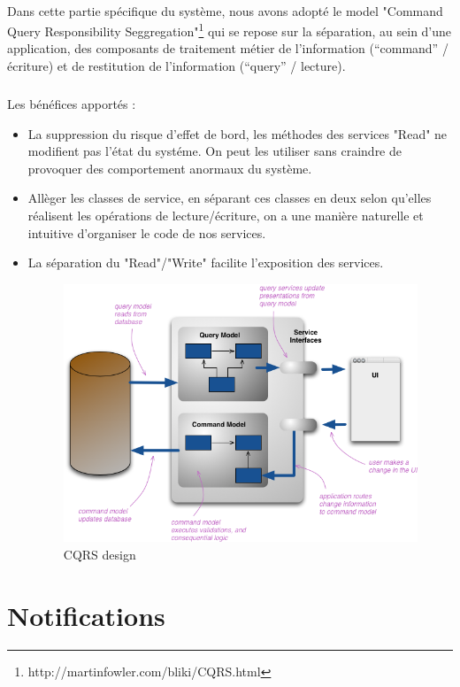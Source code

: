 \paragraph{}
Dans cette partie spécifique du système, nous avons adopté le model "Command Query Responsibility Seggregation"\footnote{http://martinfowler.com/bliki/CQRS.html} qui se repose sur la séparation, au sein d’une application, des composants de traitement métier de l’information (“command” / écriture) et de restitution de l’information (“query” / lecture).
\subparagraph{}
Les bénéfices apportés :
\begin{itemize}
\item La suppression du risque d'effet de bord, les méthodes des services "Read" ne modifient pas l'état du systéme. On peut les utiliser sans craindre de provoquer des comportement anormaux du système.
\item Allèger les classes de service, en séparant ces classes en deux selon qu'elles réalisent les opérations de lecture/écriture, on a une manière naturelle et intuitive d'organiser le code de nos services.
\item La séparation du "Read"/"Write" facilite l'exposition des services.
\begin{figure}[H]
        \centering
                \centering
                \includegraphics[width=\textwidth]{cqrs.png}
               \caption{CQRS design}
		\label{fig:CQRS design}
\end{figure}


\end{itemize}  
\newpage
\section{Notifications}

